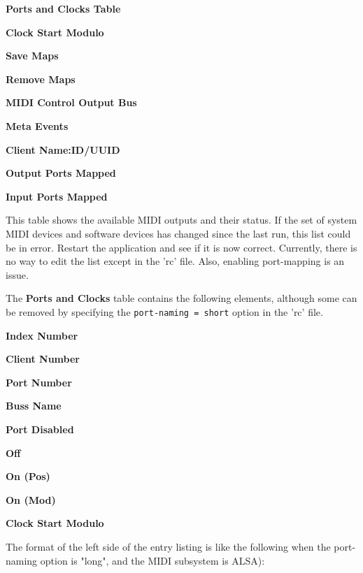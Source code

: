    \begin{enumber}
      \item \textbf{Ports and Clocks Table}
      \item \textbf{Clock Start Modulo}
      \item \textbf{Save Maps}
      \item \textbf{Remove Maps}
      \item \textbf{MIDI Control Output Bus}
      \item \textbf{Meta Events}
      \item \textbf{Client Name:ID/UUID}
      \item \textbf{Output Ports Mapped}
      \item \textbf{Input Ports Mapped}
   \end{enumber}

   \setcounter{ItemCounter}{0}      %


   This table shows the available MIDI outputs and their status.
   If the set of system MIDI devices and software devices has changed since
   the last run, this list could be in error.  Restart the application
   and see if it is now correct.  Currently, there is no way to edit the list
   except in the 'rc' file.  Also, enabling port-mapping is an issue.

   The \textbf{Ports and Clocks} table contains the following elements,
   although some can be removed by specifying the
   \texttt{port-naming = short} option in the 'rc' file.

   \begin{enumber}
      \item \textbf{Index Number}
      \item \textbf{Client Number}
      \item \textbf{Port Number}
      \item \textbf{Buss Name}
      \item \textbf{Port Disabled}
      \item \textbf{Off}
      \item \textbf{On (Pos)}
      \item \textbf{On (Mod)}
      \item \textbf{Clock Start Modulo}
   \end{enumber}

   The format of the left side of the entry listing is like the following
   when the port-naming option is "long", and the
   MIDI subsystem is ALSA):

